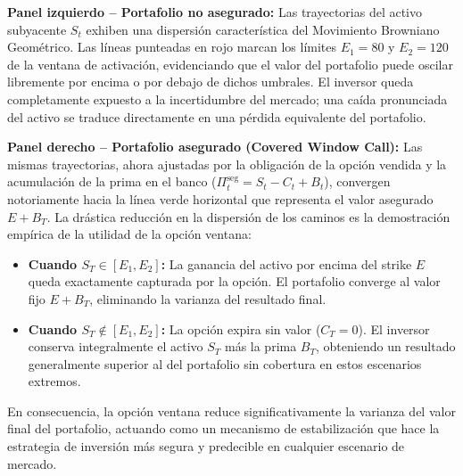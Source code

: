\documentclass[12pt, a4paper]{article}
\begin{document}
\textbf{Panel izquierdo – Portafolio no asegurado:} Las trayectorias del activo subyacente $S_t$ exhiben una dispersión característica del Movimiento Browniano Geométrico. Las líneas punteadas en rojo marcan los límites $E_1 = 80$ y $E_2 = 120$ de la ventana de activación, evidenciando que el valor del portafolio puede oscilar libremente por encima o por debajo de dichos umbrales. El inversor queda completamente expuesto a la incertidumbre del mercado; una caída pronunciada del activo se traduce directamente en una pérdida equivalente del portafolio.

\textbf{Panel derecho – Portafolio asegurado (Covered Window Call):} Las mismas trayectorias, ahora ajustadas por la obligación de la opción vendida y la acumulación de la prima en el banco ($\Pi_t^{\text{seg}} = S_t - C_t + B_t$), convergen notoriamente hacia la línea verde horizontal que representa el valor asegurado $E + B_T$. La drástica reducción en la dispersión de los caminos es la demostración empírica de la utilidad de la opción ventana:

\begin{itemize}
    \item \textbf{Cuando $S_T \in [E_1, E_2]$:} La ganancia del activo por encima del strike $E$ queda exactamente capturada por la opción. El portafolio converge al valor fijo $E + B_T$, eliminando la varianza del resultado final.
    \item \textbf{Cuando $S_T \notin [E_1, E_2]$:} La opción expira sin valor ($C_T = 0$). El inversor conserva integralmente el activo $S_T$ más la prima $B_T$, obteniendo un resultado generalmente superior al del portafolio sin cobertura en estos escenarios extremos.
\end{itemize}

En consecuencia, la opción ventana reduce significativamente la varianza del valor final del portafolio, actuando como un mecanismo de estabilización que hace la estrategia de inversión más segura y predecible en cualquier escenario de mercado.
\end{document}
